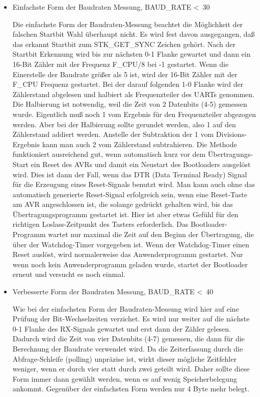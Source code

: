 \begin{itemize}

\item {Einfachste Form der Baudraten Messung, BAUD\_RATE \textless~30}

Die einfachste Form der Baudraten-Messung beachtet die Möglichkeit der
falschen Startbit Wahl überhaupt nicht. Es wird fest davon ausgegangen,
daß das erkannt Startbit zum STK\_\-GET\_\-SYNC Zeichen gehört.
Nach der Startbit Erkennung wird bis zur nächsten 0-1 Flanke gewartet
und dann ein 16-Bit Zähler mit der Frequenz F\_CPU/8 bei -1 gestartet.
Wenn die Einerstelle der Baudrate größer als 5 ist, wird der
16-Bit Zähler mit der F\_CPU Frequenz gestartet.
Bei der darauf folgenden 1-0 Flanke wird der Zählerstand abgelesen
und halbiert als Frequenzteiler des UARTs genommen.
Die Halbierung ist notwendig, weil die Zeit von 2 Datenbits (4-5) gemessen wurde.
Eigentlich muß noch 1 vom Ergebnis für den Frequenzteiler abgezogen werden.
Aber bei der Halbierung sollte gerundet werden, also 1 auf den Zählerstand
addiert werden. Anstelle der Subtraktion der 1 vom Divisions-Ergebnis kann
man auch 2 vom Zählerstand subtrahieren. 
Die Methode funktioniert ausreichend gut,
wenn automatisch kurz vor dem Übertragungs-Start ein Reset des AVRs und damit
ein Neustart des Bootloaders ausgelöst wird. Dies ist dann der Fall,
wenn das DTR (Data Terminal Ready) Signal für die Erzeugung eines Reset-Signals
benutzt wird.
Man kann auch ohne das automatisch generierte Reset-Signal erfolgreich sein,
wenn eine Reset-Taste am AVR angeschlossen ist, die solange gedrückt gehalten
wird, bis das Übertragungsprogramm gestartet ist. Hier ist aber etwas
Gefühl für den richtigen Loslass-Zeitpunkt des Tasters erforderlich.
Das Bootloader-Programm wartet nur maximal die Zeit auf den Beginn der Übertragung,
die über der Watchdog-Timer vorgegeben ist.
Wenn der Watchdog-Timer einen Reset auslöst, wird normalerweise das Anwenderprogramm
gestartet. Nur wenn noch kein Anwenderprogramm geladen wurde,
startet der Bootloader erneut und versucht es noch einmal.

\item {Verbesserte Form der Baudraten Messung, BAUD\_RATE \textless~40}

Wie bei der einfachsten Form der Baudraten-Messung wird hier auf eine Prüfung
der Bit-Wechselzeiten verzichet.
Es wird nur weiter auf die nächste 0-1 Flanke des RX-Signals
gewartet und erst dann der Zähler gelesen.
Dadurch wird die Zeit von vier Datenbits (4-7) gemessen, die dann für die Berechnung
der Baudrate verwendet wird.
Da die Zeiterfassung durch die Abfrage-Schleife (polling) unpräzise ist,
wirkt dieser mögliche Zeitfehler weniger, wenn er durch vier statt durch
zwei geteilt wird.  
Daher sollte diese Form immer dann gewählt werden, wenn es auf wenig Speicherbelegung
ankommt. Gegenüber der einfachsten Form werden nur 4 Byte mehr belegt.


\end{itemize}

